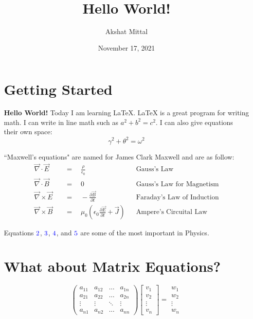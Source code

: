 \documentclass[12pt]{article}
\title{Hello World!}
\author{Akshat Mittal}
\date{November 17, 2021}
\begin{document}
\maketitle
\section{Getting Started}

\textbf{Hello World!} Today I am learning \LaTeX{}. \LaTeX{} is a great program for writing math. I can write in line math such as $a^2+b^2=c^2$. I can also give equations
their own space:
\begin{equation}
\gamma^2+\theta^2=\omega^2 \label{eq1}
\end{equation}
\begin{flushleft}
``Maxwell's equations" are named for James Clark Maxwell and are as follow:
\begin{align}
\vec{\nabla}\cdot\vec{E}\quad&=\quad\frac{\rho}{\epsilon_0} &&\text{Gauss's Law} \label{eq2}\\
\vec{\nabla}\cdot\vec{B}\quad&=\quad 0 &&\text{Gauss's Law for Magnetism} \label{eq3}\\
\vec{\nabla}\times\vec{E}\quad&=\quad -\frac{\partial \vec{B}}{\partial{t}} &&\text{Faraday's Law of Induction}\label{eq4}\\
\vec{\nabla}\times\vec{B}\quad&=\quad\mu_0\left(\epsilon_0\frac{\partial \vec{E}}{\partial t} + \vec{J}\right) &&\text{Ampere's Circuital Law}\label{eq5}
\end{align}

Equations $\color{blue}{2}$, $\color{blue}{3}$, $\color{blue}{4}$, and $\color{blue}{5}$ are some of the most important in Physics.

\section{What about Matrix Equations?}

\[
\begin{pmatrix}
{a_{11}} & {a_{12}} & \dots & {a_{1n}} \\
{a_{21}} & {a_{22}} & \dots & {a_{2n}} \\
 \vdots &\vdots & \ddots &\vdots\\
{a_{n1}} & {a_{n2}} & \dots & {a_{nn}}
\end{pmatrix}
\begin{bmatrix}
{v_1}\\
{v_2}\\
 \vdots\\
{v_n}
\end{bmatrix}
=
\begin{matrix}
{w_1}\\
{w_2}\\
 \vdots\\
{w_n}
\end{matrix}
\]

\end{flushleft}
\end{document}
